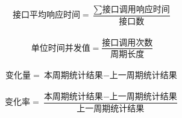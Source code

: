 \documentclass{article}
\begin{document}
\begin{CJK}{UTF8}{gbsn}
\begin{displaymath}
\text{接口平均响应时间} = \frac{\sum \text{接口调用响应时间}}{\text{接口数}}
\end{displaymath}
\\
\begin{displaymath}
\text{单位时间并发值} = \frac {\text{接口调用次数}} {\text{周期长度}}
\end{displaymath}
\\
\begin{displaymath}
\text{变化量} = {\text{本周期统计结果} - \text{上一周期统计结果}}
\end{displaymath}
\\
\begin{displaymath}
\text{变化率} = \frac {\text{本周期统计结果} - \text{上一周期统计结果}} {\text{上一周期统计结果}}
\end{displaymath}

\end{CJK}
\end{document}
